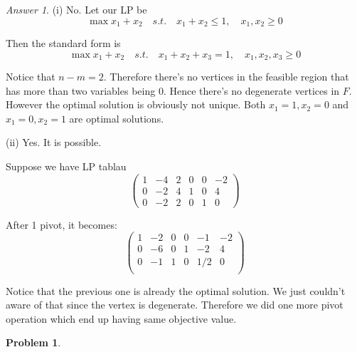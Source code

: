\documentclass[10pt,a4paper]{article}
\theoremstyle{plain}
\theoremstyle{definition}
\newtheorem{problem}{Problem}
\theoremstyle{remark}
\newtheorem*{answer*}{Answer}
\newcommand{\<}{\langle}
\renewcommand{\>}{\rangle}
\begin{document}
\begin{answer*} \hfill

(i) No. Let our LP be
\[\max x_1 + x_2\quad s.t. \quad x_1+x_2 \leq 1, \quad x_1,x_2 \geq 0\]

Then the standard form is
\[\max x_1 + x_2\quad s.t. \quad x_1+x_2+x_3 = 1, \quad x_1,x_2,x_3 \geq 0\]

Notice that $n-m = 2$. Therefore there's no vertices in the feasible region that has more than two variables being $0$. Hence there's no degenerate vertices in $F$. However the optimal solution is obviously not unique. Both $x_1=1,x_2=0$ and $x_1 = 0,x_2=1$ are optimal solutions.

(ii) Yes. It is possible.

Suppose we have LP tablau
$$
\begin{pmatrix}
1 & -4 & 2 & 0 & 0 & -2 \\
0 & -2 & 4 & 1 & 0 & 4 \\
0 & -2 & 2 & 0 & 1 & 0
\end{pmatrix}
$$

After 1 pivot, it becomes:
$$
\begin{pmatrix}
1 & -2 & 0 & 0 & -1 & -2 \\
0 & -6 & 0 & 1 & -2 & 4 \\
0 & -1 & 1 & 0 & 1/2 & 0 \\
\end{pmatrix}
$$

Notice that the previous one is already the optimal solution. We just couldn't aware of that since the vertex is degenerate. Therefore we did one more pivot operation which end up having same objective value.
\end{answer*}



\begin{problem}
\end{problem}
\end{document}
